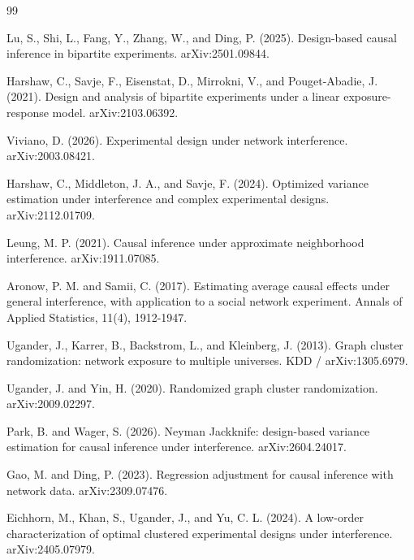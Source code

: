 \documentclass{article}
\begin{document}
\begin{thebibliography}{99}

   Lu, S., Shi, L., Fang, Y., Zhang, W., and Ding, P. (2025). Design-based causal inference in bipartite experiments. arXiv:2501.09844.

   Harshaw, C., Savje, F., Eisenstat, D., Mirrokni, V., and Pouget-Abadie, J. (2021). Design and analysis of bipartite experiments under a linear exposure-response model. arXiv:2103.06392.

   Viviano, D. (2026). Experimental design under network interference. arXiv:2003.08421.

   Harshaw, C., Middleton, J. A., and Savje, F. (2024). Optimized variance estimation under interference and complex experimental designs. arXiv:2112.01709.

   Leung, M. P. (2021). Causal inference under approximate neighborhood interference. arXiv:1911.07085.

   Aronow, P. M. and Samii, C. (2017). Estimating average causal effects under general interference, with application to a social network experiment. Annals of Applied Statistics, 11(4), 1912-1947.

   Ugander, J., Karrer, B., Backstrom, L., and Kleinberg, J. (2013). Graph cluster randomization: network exposure to multiple universes. KDD / arXiv:1305.6979.

   Ugander, J. and Yin, H. (2020). Randomized graph cluster randomization. arXiv:2009.02297.

   Park, B. and Wager, S. (2026). Neyman Jackknife: design-based variance estimation for causal inference under interference. arXiv:2604.24017.

   Gao, M. and Ding, P. (2023). Regression adjustment for causal inference with network data. arXiv:2309.07476.

   Eichhorn, M., Khan, S., Ugander, J., and Yu, C. L. (2024). A low-order characterization of optimal clustered experimental designs under interference. arXiv:2405.07979.


\end{thebibliography}
\end{document}
